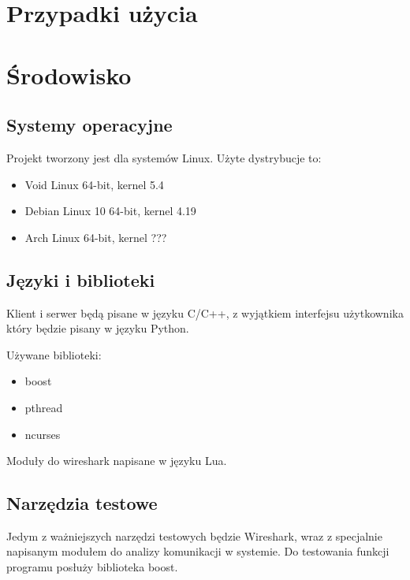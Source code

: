 \documentclass{article}
\begin{document}
\section{Przypadki użycia\label{przyp}}



\section{Środowisko\label{srod}}

\subsection{Systemy operacyjne}

Projekt tworzony jest dla systemów Linux. Użyte dystrybucje to:
\begin{itemize}

\item Void Linux 64-bit, kernel 5.4
\item Debian Linux 10 64-bit, kernel 4.19
\item Arch Linux 64-bit, kernel ???

\end{itemize}

\subsection{Języki i biblioteki}

Klient i serwer będą pisane w języku C/C++, z wyjątkiem interfejsu użytkownika który będzie pisany w języku Python.

Używane biblioteki:
\begin{itemize}

\item boost
\item pthread
\item ncurses
  
\end{itemize}


Moduły do wireshark napisane w języku Lua.

\subsection{Narzędzia testowe}

Jedym z ważniejszych narzędzi testowych będzie Wireshark, wraz z specjalnie napisanym modułem do analizy komunikacji w systemie.
 Do testowania funkcji programu posłuży biblioteka boost.
\end{document}

